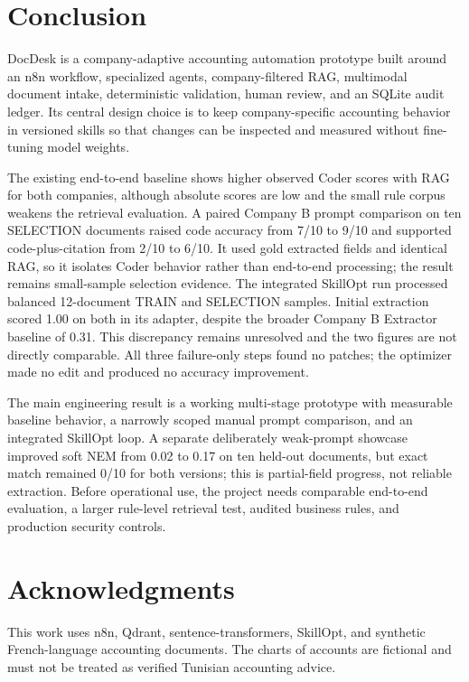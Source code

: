 \section{Conclusion}
\label{sec:conclusion}

DocDesk is a company-adaptive accounting automation prototype built around an
n8n workflow, specialized agents, company-filtered RAG, multimodal document
intake, deterministic validation, human review, and an SQLite audit ledger. Its
central design choice is to keep company-specific accounting behavior in
versioned skills so that changes can be inspected and measured without
fine-tuning model weights.

The existing end-to-end baseline shows higher observed Coder scores with RAG for both
companies, although absolute scores are low and the small rule corpus weakens
the retrieval evaluation. A paired Company B prompt comparison on ten SELECTION
documents raised code accuracy from 7/10 to 9/10 and supported code-plus-citation
from 2/10 to 6/10. It used gold extracted fields and identical RAG, so it
isolates Coder behavior rather than end-to-end processing; the result remains
small-sample selection evidence. The integrated SkillOpt
run processed balanced 12-document TRAIN and SELECTION samples. Initial
extraction scored 1.00 on both in its adapter, despite the broader Company B
Extractor baseline of 0.31. This discrepancy remains unresolved and the two
figures are not directly comparable. All three failure-only steps found no
patches; the optimizer made no edit and produced no accuracy improvement.

The main engineering result is a working multi-stage prototype with measurable
baseline behavior, a narrowly scoped manual prompt comparison, and an integrated
SkillOpt loop. A separate deliberately weak-prompt showcase improved soft NEM
from 0.02 to 0.17 on ten held-out documents, but exact match remained 0/10 for
both versions; this is partial-field progress, not reliable extraction. Before operational use, the
project needs comparable end-to-end evaluation, a larger rule-level retrieval
test, audited business rules, and production security controls.

\section*{Acknowledgments}
This work uses n8n, Qdrant, sentence-transformers, SkillOpt, and synthetic
French-language accounting documents. The charts of accounts are fictional
and must not be treated as verified Tunisian accounting advice.
